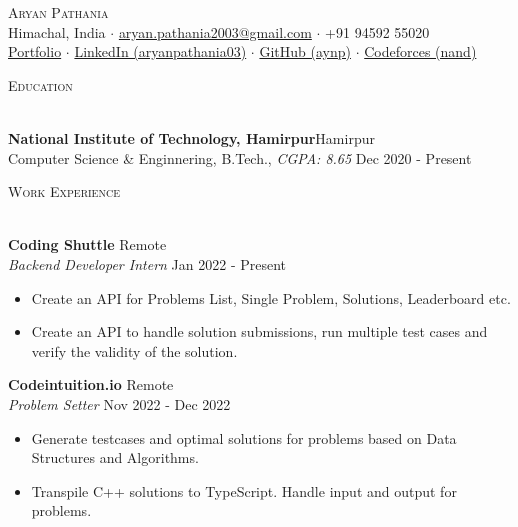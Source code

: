 \documentclass[a4paper]{article}
\newcommand{\lineunder} {
    \vspace*{-8pt} \\
    \hspace*{-18pt} \hrulefill \\
}
\newcommand{\header} [1] {
    {\hspace*{-18pt}\vspace*{6pt} \textsc{#1}}
    \vspace*{-6pt} \lineunder
}
\begin{document}

\begin{center}
	{\Huge \scshape {Aryan Pathania}}\\
	\vspace{0.5mm}
	Himachal, India $\cdot$ \href{mailto: aryan.pathania2003@gmail.com}{aryan.pathania2003@gmail.com} $\cdot$ +91 94592 55020\\
	\vspace{0.5mm}
	\href{https://aryanpathania.vercel.app/}{Portfolio} $\cdot$
	\href{https://linkedin.com/in/aryanpathania03/}{LinkedIn (aryanpathania03)} $\cdot$
	\href{https://www.github.com/aynp}{GitHub (aynp)} $\cdot$
	\href{https://www.github.com/aynp}{Codeforces (nand)} \\
\end{center}

\vspace{-4mm}

\header{Education}
\vspace{1mm}

\textbf{National Institute of Technology, Hamirpur}\hfill Hamirpur\\
Computer Science \& Enginnering, B.Tech., \textit{CGPA: 8.65} \hfill Dec 2020 - Present\\
\vspace{1.5mm}


\header{Work Experience}
\vspace{1mm}

\textbf{Coding Shuttle} \hfill Remote\\
\textit{Backend Developer Intern} \hfill Jan 2022 - Present\\
\begin{itemize}
  \item Create an API for Problems List, Single Problem, Solutions, Leaderboard etc.
	\item Create an API to handle solution submissions, run multiple test cases and verify the validity of the solution.
\end{itemize}
\vspace{1.5mm}

\textbf{Codeintuition.io} \hfill Remote\\
\textit{Problem Setter} \hfill Nov 2022 - Dec 2022\\
\begin{itemize}
	\item Generate testcases and optimal solutions for problems based on Data Structures and Algorithms.
	\item Transpile C++ solutions to TypeScript. Handle input and output for problems.
\end{itemize}
\vspace{1.5mm}
\end{document}
